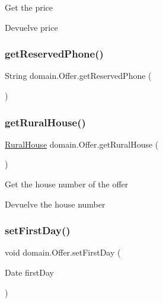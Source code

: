 Get the price

\begin{DoxyReturn}{Devuelve}
price 
\end{DoxyReturn}
\mbox{\label{classdomain_1_1_offer_ac7962273d54b3a99a40ce86c4ce53289}} 
\subsubsection{\texorpdfstring{getReservedPhone()}{getReservedPhone()}}
{\footnotesize\ttfamily String domain.\+Offer.\+get\+Reserved\+Phone (\begin{DoxyParamCaption}{ }\end{DoxyParamCaption})}

\mbox{\label{classdomain_1_1_offer_a3804f5f9ad3a3bf380e55389ccfa9dba}} 
\subsubsection{\texorpdfstring{getRuralHouse()}{getRuralHouse()}}
{\footnotesize\ttfamily \mbox{\hyperlink{classdomain_1_1_rural_house}{Rural\+House}} domain.\+Offer.\+get\+Rural\+House (\begin{DoxyParamCaption}{ }\end{DoxyParamCaption})}

Get the house number of the offer

\begin{DoxyReturn}{Devuelve}
the house number 
\end{DoxyReturn}
\mbox{\label{classdomain_1_1_offer_aca5c8e3d34e700c8e51d1c9a0685e68f}} 
\subsubsection{\texorpdfstring{setFirstDay()}{setFirstDay()}}
{\footnotesize\ttfamily void domain.\+Offer.\+set\+First\+Day (\begin{DoxyParamCaption}\item[{Date}]{first\+Day }\end{DoxyParamCaption})}

